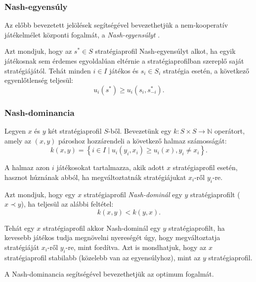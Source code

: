 \subsubsection{Nash-egyensúly}
Az előbb bevezetett jelölések segítségével bevezethetjük a nem-kooperatív játékelmélet központi fogalmát, a \emph{Nash-egyensúlyt} \cite{nash1951non}.

\begin{ert}
  Azt mondjuk, hogy az $s^* \in S$ stratégiaprofil Nash-egyensúlyt alkot,
  ha egyik játékosnak sem érdemes egyoldalúan eltérnie a stratégiaprofilban szereplő saját stratégiájától.
  Tehát minden $i \in I$ játékos és $s_i \in S_i$ stratégia esetén, a következő egyenlőtlenség teljesül:
  \[
    u_i\left(s^*\right) \ge u_i\left(s_i, s_{-i}^*\right).
  \]
\end{ert}


\subsubsection{Nash-dominancia}\label{subsubsec:NASH_DOMINANCIA}
Legyen $x$ és $y$ két stratégiaprofil $S$-ből.
Bevezetünk egy $k \colon S \times S \to \mathbb{N}$ operátort, amely az $\left( x, y \right)$ pároshoz hozzárendeli a következő halmaz számosságát:
\[
  k(x, y) = \left\{ i \in I \mid u_i(y_i, x_i) \ge u_i(x), y_i \neq x_i \right\}.
\]

A halmaz azon $i$ játékosokat tartalmazza, akik adott $x$ stratégiaprofil esetén, hasznot húznának abból, ha megváltoztatnák stratégiájukat $x_i$-ről $y_i$-re.

\begin{ert}
  Azt mondjuk, hogy egy $x$ stratégiaprofil \emph{Nash-dominál} egy $y$ stratégiaprofilt ($x \prec y$), ha teljesül az alábbi feltétel:
  \begin{equation}\label{eqn:NASH_DOMINANCIA}
    k(x,y) < k(y, x).
  \end{equation}
\end{ert}

Tehát egy $x$ stratégiaprofil akkor Nash-dominál egy $y$ stratégiaprofilt, ha kevesebb játékos tudja megnövelni nyereségét úgy, hogy megváltoztatja stratégiáját $x_i$-ről $y_i$-re, mint fordítva.
Azt is mondhatjuk, hogy az $x$ stratégiaprofil stabilabb (közelebb van az egyensúlyhoz), mint az $y$ stratégiaprofil.


A Nash-dominancia segítségével bevezethetjük az optimum fogalmát.

